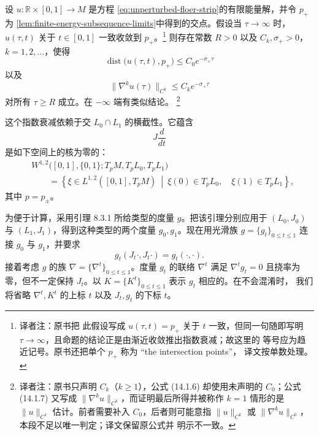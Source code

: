 \begin{proposition}
\label{prop:finite-energy-exponential-decay}
设 $u:\mathbb R\times[0,1]\to M$ 是方程
\eqref{eq:unperturbed-floer-strip}的有限能量解，并令 $p_+$ 为
\cref{lem:finite-energy-subsequence-limits}中得到的交点。假设当
$\tau\to\infty$ 时，$u(\tau,t)$ 关于 $t\in[0,1]$ 一致收敛到 $p_+$。\footnote{译者注：原书把
此假设写成 $u(\tau,t)=p_+$ 关于 $t$ 一致，但同一句随即写明
$\tau\to\infty$，且命题的结论正是由渐近收敛推出指数衰减；故这里的
等号应为趋近记号。原书还把单个 $p_+$ 称为 ``the intersection points''，
译文按单数处理。}
则存在常数 $R>0$ 以及 $C_k,\sigma_+>0$，$k=1,2,\ldots$，使得
\begin{equation}
  \operatorname{dist}\bigl(u(\tau,t),p_+\bigr)
  \leq C_0e^{-\sigma_+\tau}
\label{eq:exponential-distance-decay}
\end{equation}
以及
\begin{equation}
  \|\nabla^k u(\tau)\|_{C^k}
  \leq C_ke^{-\sigma_+\tau}
\label{eq:exponential-derivative-decay}
\end{equation}
对所有 $\tau\geq R$ 成立。在 $-\infty$ 端有类似结论。
\footnote{译者注：原书只声明 $C_k$（$k\geq1$），公式 (14.1.6) 却使用未声明的
$C_0$；公式 (14.1.7) 又写成 $\|\nabla^k u\|_{C^k}$，而证明最后所得并被称作
$k=1$ 情形的是 $\|u\|_{C^1}$ 估计。前者需要补入 $C_0$，后者则可能意指
$\|u\|_{C^k}$ 或 $\|\nabla^k u\|_{C^0}$，本段不足以唯一判定；译文保留原公式并
明示不一致。}
\end{proposition}

这个指数衰减依赖于交 $L_0\cap L_1$ 的横截性。它蕴含\termAsymptoticOperator{}
\[
  J\frac d{dt}
\]
是如下空间上的核为零的\termSelfAdjointOperator{}：
\[
  \begin{aligned}
  &W^{1,2}
    \bigl([0,1],\{0,1\};T_pM,T_pL_0,T_pL_1\bigr)\\
  &\qquad=
    \left\{
      \xi\in L^{1,2}([0,1],T_pM)
      \ \middle|\
      \xi(0)\in T_pL_0,\quad\xi(1)\in T_pL_1
    \right\},
  \end{aligned}
\]
其中 $p=p_\pm$。

为便于计算，采用引理 8.3.1 所给类型的度量 $g$。把该引理分别应用于
$(L_0,J_0)$ 与 $(L_1,J_1)$，得到这种类型的两个度量 $g_0,g_1$。现在用光滑族
$g=\{g_t\}_{0\leq t\leq1}$ 连接 $g_0$ 与 $g_1$，并要求
\[
  g_t(J_t\mathord\cdot,J_t\mathord\cdot)=g_t(\mathord\cdot,\mathord\cdot).
\]
接着考虑 $g$ 的\termLeviCivitaConnection{}族
$\nabla=\{\nabla^t\}_{0\leq t\leq1}$。度量 $g_t$ 的\personLeviCivita{}联络
$\nabla^t$ 满足 $\nabla^tg_t=0$ 且挠率为零，但不一定保持 $J_t$。以
$K=\{K^t\}_{0\leq t\leq1}$ 表示 $g_t$ 相应的\termCurvatureTensor{}。在不会混淆时，
我们将省略 $\nabla^t,K^t$ 的上标 $t$ 以及 $J_t,g_t$ 的下标 $t$。

